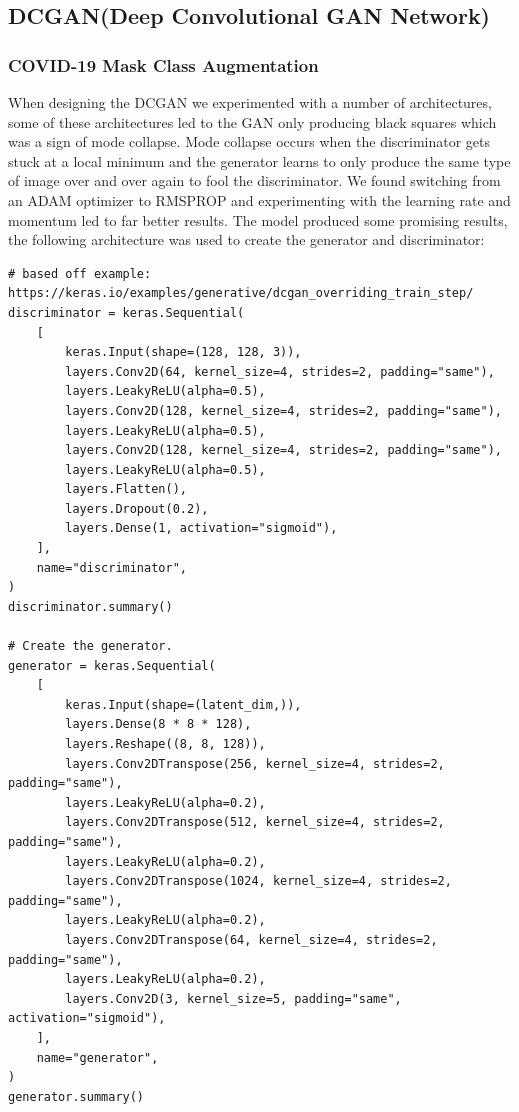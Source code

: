 \subsection{DCGAN(Deep Convolutional GAN Network)}
\subsubsection{COVID-19 Mask Class Augmentation}
When designing the DCGAN we experimented with a number of architectures, some of these architectures led to the GAN only producing black squares which was a sign of mode collapse.  Mode collapse occurs when the discriminator gets stuck at a local minimum and the generator learns to only produce the same type of image over and over again to fool the discriminator. We found switching from an ADAM optimizer to RMSPROP and experimenting with the learning rate and momentum led to far better results.  The model produced some promising results, the following architecture was used to create the generator and discriminator:
\begin{verbatim}
# based off example: https://keras.io/examples/generative/dcgan_overriding_train_step/
discriminator = keras.Sequential(
    [
        keras.Input(shape=(128, 128, 3)),
        layers.Conv2D(64, kernel_size=4, strides=2, padding="same"),
        layers.LeakyReLU(alpha=0.5),
        layers.Conv2D(128, kernel_size=4, strides=2, padding="same"),
        layers.LeakyReLU(alpha=0.5),
        layers.Conv2D(128, kernel_size=4, strides=2, padding="same"),
        layers.LeakyReLU(alpha=0.5),
        layers.Flatten(),
        layers.Dropout(0.2),
        layers.Dense(1, activation="sigmoid"),
    ],
    name="discriminator",
)
discriminator.summary()

# Create the generator.
generator = keras.Sequential(
    [
        keras.Input(shape=(latent_dim,)),
        layers.Dense(8 * 8 * 128),
        layers.Reshape((8, 8, 128)),
        layers.Conv2DTranspose(256, kernel_size=4, strides=2, padding="same"),
        layers.LeakyReLU(alpha=0.2),
        layers.Conv2DTranspose(512, kernel_size=4, strides=2, padding="same"),
        layers.LeakyReLU(alpha=0.2),
        layers.Conv2DTranspose(1024, kernel_size=4, strides=2, padding="same"),
        layers.LeakyReLU(alpha=0.2),
        layers.Conv2DTranspose(64, kernel_size=4, strides=2, padding="same"),
        layers.LeakyReLU(alpha=0.2),
        layers.Conv2D(3, kernel_size=5, padding="same", activation="sigmoid"),
    ],
    name="generator",
)
generator.summary()
\end{verbatim}
